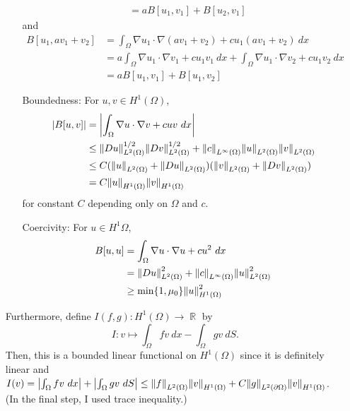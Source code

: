 \documentclass{article}
\DeclareMathOperator{\rr}{\mathbb{R}}
\begin{document}
\begin{enumerate}
\begin{enumerate}
\begin{equation*}
\begin{split}
&=aB[u_1,v_1]+B[u_2,v_1]
\end{split}
\end{equation*}
and
\begin{equation*}
\begin{split}
B[u_1,av_1+v_2]&=\int_\Omega \nabla u_1\cdot \nabla (av_1+v_2) + cu_1(av_1+v_2)~dx\\
&=a\int_\Omega \nabla u_1\cdot \nabla v_1 + cu_1v_1~dx+\int_\Omega \nabla u_1\cdot \nabla v_2 + cu_1v_2~dx\\
&=aB[u_1,v_1]+B[u_1,v_2]
\end{split}
\end{equation*}
\item[Boundedness:] For $u,v\in H^1(\Omega)$,
\begin{equation*}
\begin{split}
\abs{B[u,v]}&=\abs{\int_\Omega \nabla u \cdot\nabla v + cuv~dx} \\
&\leq\norm{Du}^{1/2}_{L^2(\Omega)}\norm{Dv}^{1/2}_{L^2(\Omega)}+\norm{c}_{L^\infty(\Omega)}\norm{u}_{L^2(\Omega)}\norm{v}_{L^2(\Omega)}\\
&\leq C(\norm{u}_{L^2(\Omega)}+\norm{Du}_{L^2(\Omega)})(\norm{v}_{L^2(\Omega)}+\norm{Dv}_{L^2(\Omega)}) \\
&=C\norm{u}_{H^1(\Omega)}\norm{v}_{H^1(\Omega)}
\end{split}
\end{equation*}
for constant $C$ depending only on $\Omega$ and $c$.
\item[Coercivity:] For $u\in H^1{\Omega}$,
\begin{equation*}
\begin{split}
B[u,u]&=\int_\Omega \nabla u \cdot\nabla u + cu^2~dx \\
&=\norm{Du}^2_{L^2(\Omega)}+\norm{c}_{L^\infty(\Omega)}\norm{u}^2_{L^2(\Omega)}\\
&\geq \min\{1,\mu_0\}\norm{u}^2_{H^1(\Omega)}
\end{split}
\end{equation*}
\end{enumerate}
Furthermore, define $I(f,g):H^1(\Omega)\rightarrow \rr$ by
\begin{equation*}
I:v\mapsto \int_{\Omega} fv~dx-\int_{\Omega} gv~dS.
\end{equation*}
Then, this is a bounded linear functional on $H^1(\Omega)$ since it is definitely linear and $I(v)=\abs{\int_{\Omega} fv~dx}+\abs{\int_{\Omega} gv~dS}\leq \norm{f}_{L^2(\Omega)}\norm{v}_{H^1(\Omega)}+C\norm{g}_{L^2(\partial \Omega)}\norm{v}_{H^1(\Omega)}$. (In the final step, I used trace inequality.)


\end{enumerate}
\end{document}
